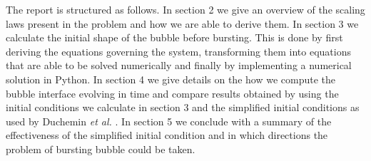 The report is structured as follows. In section 2 we give an overview of the scaling laws present in the problem and how we are able to derive them. In section 3 we calculate the initial shape of the bubble before bursting. This is done by first deriving the equations governing the system, transforming them into equations that are able to be solved numerically and finally by implementing a numerical solution in Python. In section 4 we give details on the how we compute the bubble interface evolving in time and compare results obtained by using the initial conditions we calculate in section 3 and the simplified initial conditions as used by Duchemin \textit{et al.} \cite{duchemin2002jet}. In section 5 we conclude with a summary of the effectiveness of the simplified initial condition and in which directions the problem of bursting bubble could be taken.